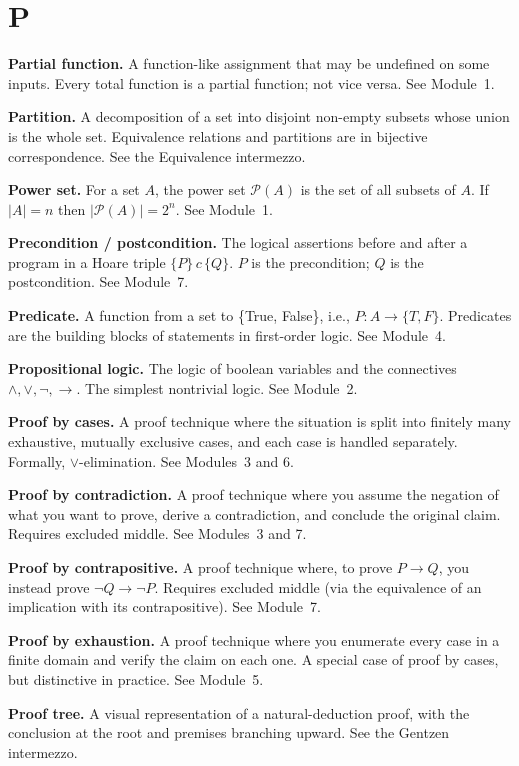 \documentclass[11pt]{article}
\begin{document}
\section*{P}

\textbf{Partial function.} A function-like assignment that may be undefined on some inputs. Every total function is a partial function; not vice versa. See Module~1.

\textbf{Partition.} A decomposition of a set into disjoint non-empty subsets whose union is the whole set. Equivalence relations and partitions are in bijective correspondence. See the Equivalence intermezzo.

\textbf{Power set.} For a set $A$, the power set $\mathcal{P}(A)$ is the set of all subsets of $A$. If $|A| = n$ then $|\mathcal{P}(A)| = 2^n$. See Module~1.

\textbf{Precondition / postcondition.} The logical assertions before and after a program in a Hoare triple $\{P\}\, c\, \{Q\}$. $P$ is the precondition; $Q$ is the postcondition. See Module~7.

\textbf{Predicate.} A function from a set to \{True, False\}, i.e., $P : A \to \{T, F\}$. Predicates are the building blocks of statements in first-order logic. See Module~4.

\textbf{Propositional logic.} The logic of boolean variables and the connectives $\wedge, \vee, \lnot, \to$. The simplest nontrivial logic. See Module~2.

\textbf{Proof by cases.} A proof technique where the situation is split into finitely many exhaustive, mutually exclusive cases, and each case is handled separately. Formally, $\vee$-elimination. See Modules~3 and 6.

\textbf{Proof by contradiction.} A proof technique where you assume the negation of what you want to prove, derive a contradiction, and conclude the original claim. Requires excluded middle. See Modules~3 and 7.

\textbf{Proof by contrapositive.} A proof technique where, to prove $P \to Q$, you instead prove $\lnot Q \to \lnot P$. Requires excluded middle (via the equivalence of an implication with its contrapositive). See Module~7.

\textbf{Proof by exhaustion.} A proof technique where you enumerate every case in a finite domain and verify the claim on each one. A special case of proof by cases, but distinctive in practice. See Module~5.

\textbf{Proof tree.} A visual representation of a natural-deduction proof, with the conclusion at the root and premises branching upward. See the Gentzen intermezzo.
\end{document}
